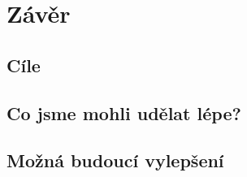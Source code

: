 \chapter{Závěr}

\section{Cíle}

\section{Co jsme mohli udělat lépe?}

\section{Možná budoucí vylepšení}










